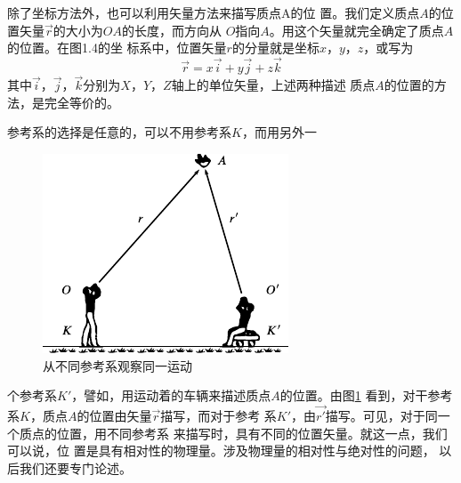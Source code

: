 除了坐标方法外，也可以利用矢量方法来描写质点A的位
置。我们定义质点$A$的位置矢量$\vec{r}$的大小为$OA$的长度，而方向从
$O$指向$A$。用这个矢量就完全确定了质点$A$的位置。在图1.4的坐
标系中，位置矢量$r$的分量就是坐标$x$，$y$，$z$，或写为
\begin{equation}\label{eqn:01.04.01}
  \vec{r}=x\vec{i}+y\vec{j}+z\vec{k}
\end{equation}
其中$\vec{i}$，$\vec{j}$，$\vec{k}$分别为$X$，$Y$，$Z$轴上的单位矢量，上述两种描述
质点$A$的位置的方法，是完全等价的。

参考系的选择是任意的，可以不用参考系$K$，而用另外一
\begin{figure}
  \includegraphics{figure/fig01.05}
  \caption{从不同参考系观察同一运动}
  \label{fig:01.05}
\end{figure}
个参考系$K'$，譬如，用运动着的车辆来描述质点$A$的位置。由图\ref{fig:01.05}
看到，对干参考系$K$，质点$A$的位置由矢量$\vec{r}$描写，而对于参考
系$K'$，由$\vec{r'}$描写。可见，对于同一个质点的位置，用不同参考系
来描写时，具有不同的位置矢量。就这一点，我们可以说，位
置是具有相对性的物理量。涉及物理量的相对性与绝对性的问题，
以后我们还要专门论述。